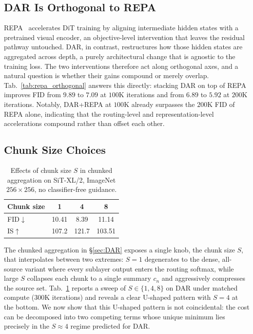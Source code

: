 \documentclass{llmxive}
\providecommand{\arraystretch}{1.12}
\begin{document}
\subsection{DAR Is Orthogonal to REPA}
REPA~\citep{yu2025repa} accelerates DiT training by aligning intermediate hidden states with a pretrained visual encoder, an objective-level intervention that leaves the residual pathway untouched. \textsc{DAR}, in contrast, restructures how those hidden states are aggregated across depth, a purely architectural change that is agnostic to the training loss. The two interventions therefore act along orthogonal axes, and a natural question is whether their gains compound or merely overlap. Tab.~\ref{tab:repa_orthogonal} answers this directly: stacking \textsc{DAR} on top of REPA improves FID from $9.89$ to $7.09$ at $100\text{K}$ iterations and from $6.89$ to $5.92$ at $200\text{K}$ iterations. Notably, \textsc{DAR}+REPA at $100\text{K}$ already surpasses the $200\text{K}$ FID of REPA alone, indicating that the routing-level and representation-level accelerations compound rather than offset each other.

\subsection{Chunk Size Choices}
\label{sec:chunk}

\begin{table}[t]
\vspace{-1.0em}
\centering
\setlength{\tabcolsep}{6pt}
\renewcommand{\arraystretch}{1.12}
\small
\begin{tabular}{lccc}
\toprule
Chunk size & 1 & 4 & 8 \\
\midrule
FID$\downarrow$ & 10.41 & 8.39  & 11.14 \\
IS$\uparrow$    & 107.2 & 121.7 & 103.51 \\
\bottomrule
\end{tabular}
\caption{Effects of chunk size $S$ in chunked aggregation on SiT-XL/2, ImageNet $256{\times}256$, no classifier-free guidance.}
\label{tab:chunk_size}
\vspace{-0.8em}

\end{table}

The chunked aggregation in \S\ref{sec:DAR} exposes a single knob, the chunk size $S$, that interpolates between two extremes: $S=1$ degenerates to the dense, all-source variant where every sublayer output enters the routing softmax, while large $S$ collapses each chunk to a single summary $c_n$ and aggressively compresses the source set. Tab.~\ref{tab:chunk_size} reports a sweep of $S \in \{1, 4, 8\}$ on \textsc{DAR} under matched compute ($300\text{K}$ iterations) and reveals a clear U-shaped pattern with $S = 4$ at the bottom. We now show that this U-shaped pattern is not coincidental: the cost can be decomposed into two competing terms whose unique minimum lies precisely in the $S \approx 4$ regime predicted for \textsc{DAR}.
\end{document}
